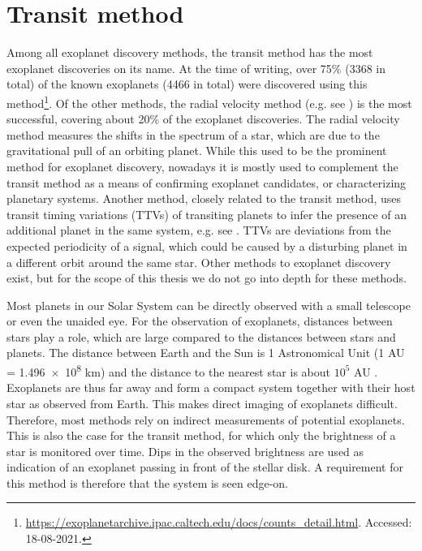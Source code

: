 
\section{Transit method}
\label{sec:transit}


Among all exoplanet discovery methods, the transit method has the most exoplanet discoveries on its name. At the time of writing, over 75\% (3368 in total) of the known exoplanets (4466 in total) were discovered using this method\footnote{\url{https://exoplanetarchive.ipac.caltech.edu/docs/counts_detail.html}. Accessed: 18-08-2021.}. Of the other methods, the radial velocity method (e.g. see \cite{mayor1995jupiter}) is the most successful, covering about 20\% of the exoplanet discoveries. The radial velocity method measures the shifts in the spectrum of a star, which are due to the gravitational pull of an orbiting planet. While this used to be the prominent method for exoplanet discovery, nowadays it is mostly used to complement the transit method as a means of confirming exoplanet candidates, or characterizing planetary systems. Another method, closely related to the transit method, uses transit timing variations (TTVs) of transiting planets to infer the presence of an additional planet in the same system, e.g. see \cite{ballard2011kepler}. TTVs are deviations from the expected periodicity of a signal, which could be caused by a disturbing planet in a different orbit around the same star. Other methods to exoplanet discovery exist, but for the scope of this thesis we do not go into depth for these methods.

Most planets in our Solar System can be directly observed with a small telescope or even the unaided eye. For the observation of exoplanets, distances between stars play a role, which are large compared to the distances between stars and planets. The distance between Earth and the Sun is 1 Astronomical Unit (1 AU = \num{1.496e8} km) and the distance to the nearest star is about $10^5$ AU \citep{brown2021gaia}. Exoplanets are thus far away and form a compact system together with their host star as observed from Earth. This makes direct imaging of exoplanets difficult. Therefore, most methods rely on indirect measurements of potential exoplanets. This is also the case for the transit method, for which only the brightness of a star is monitored over time. Dips in the observed brightness are used as indication of an exoplanet passing in front of the stellar disk. A requirement for this method is therefore that the system is seen edge-on. 

